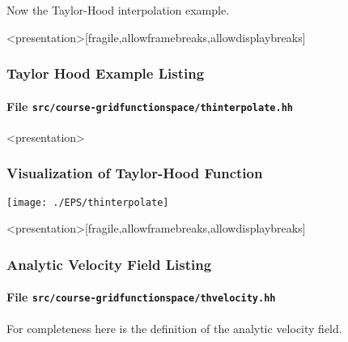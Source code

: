 Now the Taylor-Hood interpolation example.

\begin{frame}<presentation>[fragile,allowframebreaks,allowdisplaybreaks]
\frametitle<presentation>{Taylor Hood Example Listing}
\framesubtitle<presentation>{File \texttt{src/course-gridfunctionspace/thinterpolate.hh}}

\end{frame}

\begin{frame}<presentation>
\frametitle<presentation>{Visualization of Taylor-Hood Function}
\begin{center}
\texttt{[image: ./EPS/thinterpolate]}
\end{center}
\end{frame}


\begin{frame}<presentation>[fragile,allowframebreaks,allowdisplaybreaks]
\frametitle<presentation>{Analytic Velocity Field Listing}
\framesubtitle<presentation>{File \texttt{src/course-gridfunctionspace/thvelocity.hh}}
For completeness here is the definition of the analytic velocity field.

\end{frame}


